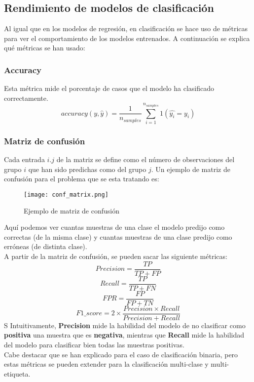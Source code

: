 \subsection{Rendimiento de modelos de clasificación}
\label{metric:class}
Al igual que en los modelos de regresión, en clasificación se hace uso de métricas para ver el comportamiento de los modelos entrenados. A continuación se explica qué métricas se han usado:
\subsubsection*{Accuracy}
Esta métrica mide el porcentaje de casos que el modelo ha clasificado correctamente.
\[accuracy(y,\hat{y})=\frac{1}{n_{samples}}\sum_{i=1}^{n_{samples}}1(\hat{y_i}=y_i)\]
\subsubsection*{Matriz de confusión}
Cada entrada $i.j$ de la matriz se define como el número de observaciones del grupo $i$ que han sido predichas como del grupo $j$. Un ejemplo de matriz de confusión para el problema que se esta tratando es:
\begin{figure}[H]
	\centering
	\texttt{[image: conf\_matrix.png]}
	\caption{Ejemplo de matriz de confusión}
	\label{fig:conf_matrix}
\end{figure}
Aquí podemos ver cuantas muestras de una clase el modelo predijo como correctas (de la misma clase) y cuantas muestras de una clase predijo como erróneas (de distinta clase).\\
\linebreak
A partir de la matriz de confusión, se pueden sacar las siguiente métricas:
\[Precision = \frac{TP} {TP + FP}\]
\[Recall = \frac{TP}{TP + FN}\]
\[FPR = \frac{FP}{FP + TN}\]
\[F1\_score = 2 \times \frac{Precision \times Recall}{Precision + Recall} \]S
Intuitivamente, \textbf{Precision} mide la habilidad del modelo de no clasificar como \textbf{positiva} una muestra que es \textbf{negativa}, mientras que \textbf{Recall} mide la habilidad del modelo para clasificar bien todas las muestras positivas.\\
\linebreak
Cabe destacar que se han explicado para el caso de clasificación binaria, pero estas métricas se pueden extender para la clasificación multi-clase y multi-etiqueta.
